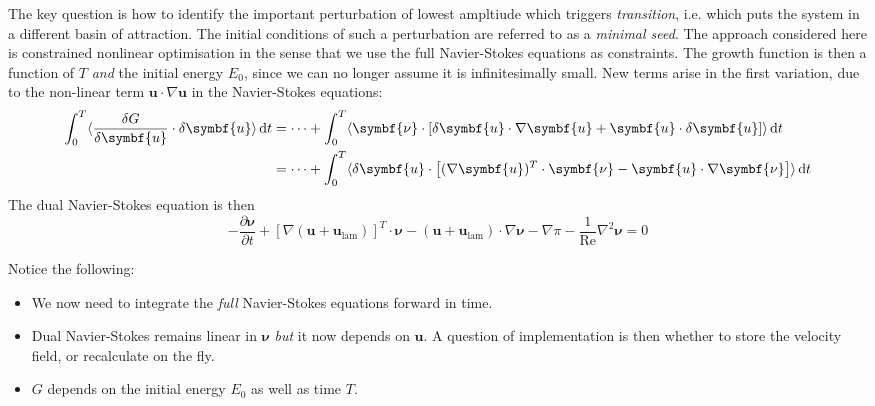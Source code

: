 \documentclass{jknotes}
\renewcommand{\u}{\symbf{u}}
\newcommand{\ReN}{\text{Re}}
\begin{document}
The key question is how to identify the important perturbation of lowest
ampltiude which triggers \emph{transition}, i.e. which puts the system in a
different basin of attraction. The initial conditions of such a perturbation
are referred to as a \emph{minimal seed}. The approach considered here is
constrained nonlinear optimisation in the sense that we use the full
Navier-Stokes equations as constraints. The growth function is then a function
of $T$ \emph{and} the initial energy $E_0$, since we can no longer assume it
is infinitesimally small. New terms arise in the first variation, due to the
non-linear term $\u \cdot \nabla \u$ in the Navier-Stokes equations:
\begin{align}
	\int_0^T \langle \frac{\delta G}{\delta \u} \cdot \delta \u \rangle \,
	\diffd t &= \dots + \int_0^T \langle \symbf{\nu}\cdot\left[\delta \u \cdot
	\nabla \u + \u \cdot \delta \u \right] \rangle \, \diffd t \\
			 &= \dots + \int_0^T \langle \delta \u \cdot \left[ (\nabla \u)^T
			 \cdot \symbf{\nu} - \u \cdot \nabla \symbf{\nu}\right]\rangle \,
			 \diffd t
\end{align}
The dual Navier-Stokes equation is then
\begin{equation}
	-\frac{\partial \symbf{\nu}}{\partial t} + \left[ \nabla(\u +
	\u_{\text{lam}})\right]^T \cdot \symbf{\nu} - (\u + \u_{\text{lam}})\cdot
	\nabla \symbf{\nu} - \nabla \pi - \frac{1}{\ReN} \nabla^2 \symbf{\nu} = 0
\end{equation}

Notice the following:
\begin{itemize}
	\item We now need to integrate the \emph{full} Navier-Stokes equations
		forward in time.
	\item Dual Navier-Stokes remains linear in $\symbf{\nu}$ \emph{but} it now
		depends on $\u$. A question of implementation is then whether to store
		the velocity field, or recalculate on the fly.
	\item $G$ depends on the initial energy $E_0$ as well as time $T$.
\end{itemize}
\end{document}
